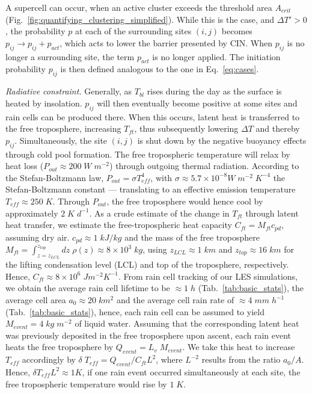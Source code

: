 \documentclass[draft,linenumbers]{agujournal2019}
\begin{document}
A supercell can occur, when an active cluster exceeds the threshold area $A_{crit}$ (Fig.~\ref{fig:quantifying_clustering_simplified}). 
While this is the case, and $\Delta T'>0$, the probability $p$ at each of the surrounding sites $(i,j)$ becomes $p_{ij}\rightarrow p_{ij}+p_{act}$, which acts to lower the barrier presented by CIN.
When $p_{ij}$ is no longer a surrounding site, the term $p_{act}$ is no longer applied.
The initiation probability $p_{ij}$ is then defined analogous to the one in Eq.~\ref{eq:cases}.

\noindent
{\it Radiative constraint.}
Generally, as $T_{bl}$ rises during the day as the surface is heated by insolation. 
$p_{ij}$ will then eventually become positive at some sites and rain cells can be produced there.
When this occurs, latent heat is transferred to the free troposphere, increasing $T_{ft}$, thus subsequently lowering $\Delta T$ and thereby $p_{ij}$.
Simultaneously, the site $(i,j)$ is shut down by the negative buoyancy effects through cold pool formation.
The free tropospheric temperature will relax by heat loss ($P_{out}\approx 200\;W\;m^{-2}$) through outgoing thermal radiation. 
According to the Stefan-Boltzmann law, $P_{out}=\sigma T_{eff}^4$, with $\sigma\approx 5.7\times 10^{-8}W\;m^{-2}\;K^{-4}$ the Stefan-Boltzmann constant --- translating to an effective emission temperature $T_{eff}\approx 250\;K$. 
Through $P_{out}$, the free troposphere would hence cool by approximately $2\;K\;d^{-1}$.
As a crude estimate of the change in $T_{ft}$ through latent heat transfer, we estimate the free-tropospheric heat capacity $C_{ft}=M_{ft}c_{pd}$, assuming dry air.
$c_{pd}\approx 1\;kJ/kg$ and the mass of the free troposphere $M_{ft}=\int_{z=z_{LCL}}^{z_{top}}dz\;\rho(z)\approx 8\times 10^3\;kg$, using $z_{LCL}\approx 1\;km$ and $z_{top}\approx 16\;km$ for the lifting condensation level (LCL) and top of the troposphere, respectively.
Hence, $C_{ft}\approx 8\times 10^6\;Jm^{-2}K^{-1}$.
From rain cell tracking of our LES simulations, we obtain the average rain cell lifetime to be $\approx 1\;h$ (Tab.~\ref{tab:basic_stats}), the average cell area $a_0\approx 20\;km^2$ and the average cell rain rate of $\approx 4\;mm\;h^{-1}$ (Tab.~\ref{tab:basic_stats}), hence, each rain cell can be assumed to yield $M_{event}=4\;kg\;m^{-2}$ of liquid water.
Assuming that the corresponding latent heat was previously deposited in the free troposphere upon ascent, each rain event heats the free troposphere by $Q_{event}=L_v\;M_{event}$.
We take this heat to increase $T_{eff}$ accordingly by $\delta\;T_{eff}=Q_{event}/C_{ft}L^{2}$, where $L^{-2}$ results from the ratio $a_0/A$.
Hence, $\delta T_{eff}L^2\approx 1K$, if one rain event occurred simultaneously at each site, the free tropospheric temperature would rise by $1\;K$.
\end{document}

